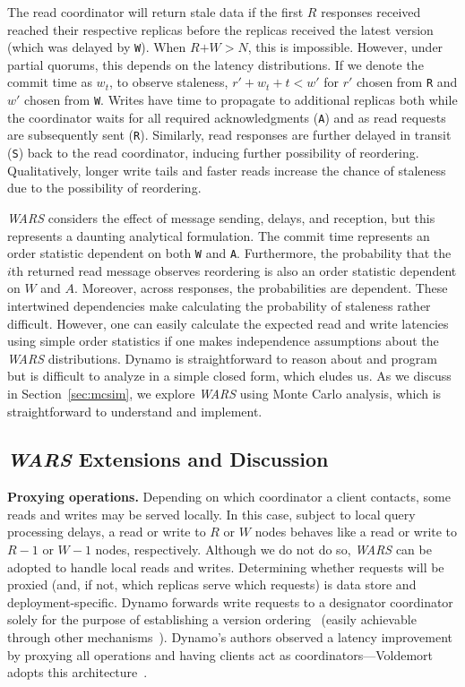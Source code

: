 \documentclass{vldb}
\newcommand{\subsectionskip}{-0em}
\begin{document}
The read coordinator will return stale data if the first $R$ responses
received reached their respective replicas before the replicas
received the latest version (which was delayed by \texttt{W}).  When
$R$$+$$W$$>$$N$, this is impossible.  However, under partial quorums,
this depends on the latency distributions.  If we denote the commit
time as $w_t$, to observe staleness, $r'+w_t+t< w'$ for $r'$ chosen
from \texttt{R} and $w'$ chosen from \texttt{W}.  Writes have time to
propagate to additional replicas both while the coordinator waits for
all required acknowledgments (\texttt{A}) and as read requests are
subsequently sent (\texttt{R}).  Similarly, read responses are further
delayed in transit (\texttt{S}) back to the read coordinator, inducing
further possibility of reordering.  Qualitatively, longer write tails
and faster reads increase the chance of staleness due to the
possibility of reordering.

\textit{WARS} considers the effect of message sending, delays, and
reception, but this represents a daunting analytical formulation.  The
commit time represents an order statistic dependent on both \texttt{W}
and \texttt{A}.  Furthermore, the probability that the $i$th returned
read message observes reordering is also an order statistic dependent
on $W$ and $A$.  Moreover, across responses, the probabilities are
dependent. These intertwined dependencies make calculating the
probability of staleness rather difficult.  However, one can easily
calculate the expected read and write latencies using simple order
statistics if one makes independence assumptions about the
\textit{WARS} distributions.  Dynamo is straightforward to reason
about and program but is difficult to analyze in a simple closed form,
which eludes us.  As we discuss in Section~\ref{sec:mcsim}, we explore
\textit{WARS} using Monte Carlo analysis, which is straightforward to
understand and implement.

\vspace{\subsectionskip}\subsection{{\large \textit{WARS}} Extensions and Discussion}
\label{sec:anti-entropy}

\textbf{Proxying operations.} Depending on which coordinator a client
contacts, some reads and writes may be served locally.  In this case,
subject to local query processing delays, a read or write to $R$ or
$W$ nodes behaves like a read or write to $R-1$ or $W-1$ nodes,
respectively.  Although we do not do so, \textit{WARS} can be adopted
to handle local reads and writes.  Determining whether requests will
be proxied (and, if not, which replicas serve which requests) is data
store and deployment-specific.  Dynamo forwards write requests to a
designator coordinator solely for the purpose of establishing a
version ordering~\cite[Section 6.4]{dynamo} (easily achievable through
other mechanisms~\cite{zookeeper}).  Dynamo's authors observed a
latency improvement by proxying all operations and having clients act
as coordinators---Voldemort adopts this
architecture~\cite{voldemortclient}.
\end{document}

